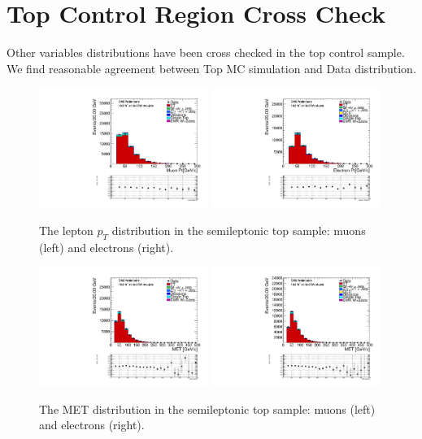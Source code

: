 \section{Top Control Region Cross Check}
\label{app:ttbar}

Other variables distributions have been cross checked in the top control sample. We find reasonable agreement between Top MC simulation and Data distribution.
\begin{figure}[htb] 
  {\centering
    \includegraphics[width=0.49\textwidth]{figs/topwjes/mu_EWK_W_2jets_l_pt_TTbarControlPlots_EWKW2jets.pdf}
    \includegraphics[width=0.49\textwidth]{figs/topwjes/el_EWK_W_2jets_l_pt_TTbarControlPlots_met_30_WmT_30_EWKW2jets.pdf}
    \caption{The lepton $p_{T}$ distribution in the semileptonic top sample: muons (left) and electrons (right).}
    \label{fig:topw:lpt}}
\end{figure}
\begin{figure}[htb] 
  {\centering
    \includegraphics[width=0.49\textwidth]{figs/topwjes/mu_event_met_pfmet_TTbarControlPlots_EWKW2jets.pdf}
    \includegraphics[width=0.49\textwidth]{figs/topwjes/el_event_met_pfmet_TTbarControlPlots_met_30_WmT_30_EWKW2jets.pdf}
    \caption{The MET distribution in the semileptonic top sample: muons (left) and electrons (right).}
    \label{fig:topw:met}}
\end{figure}
